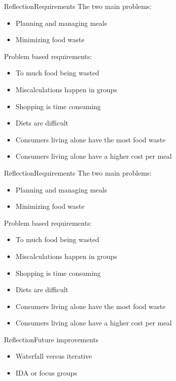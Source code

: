 \begin{frame}{Reflection}{Requirements}%
	The two main problems:
	\begin{itemize}
		\item Planning and managing meals
		\item Minimizing food waste
	\end{itemize}	
	Problem based requirements:
	\begin{itemize}
		\item To much food being wasted
		\item Miscalculations happen in groups
		\item Shopping is time consuming
		\item Diets are difficult
		\item Consumers living alone have the most food waste
		\item Consumers living alone have a higher cost per meal
	\end{itemize}

\end{frame}
\begin{frame}{Reflection}{Requirements}%
The two main problems:
	\begin{itemize} \color{dkgreen}
		\item Planning and managing meals
		\item Minimizing food waste
	\end{itemize}
	Problem based requirements:
	\begin{itemize}
		\item {\color{dkgreen}To much food being wasted}
		\item {\color{red}Miscalculations happen in groups}
		\item {\color{orange}Shopping is time consuming}
		\item {\color{dkgreen}Diets are difficult}
		\item {\color{red}Consumers living alone have the most food waste}
		\item {\color{red}Consumers living alone have a higher cost per meal}
	\end{itemize}
\end{frame}

\begin{frame}{Reflection}{Future improvements}
	\begin{itemize}
		\item Waterfall versus iterative
		\item IDA or focus groups
	\end{itemize}
\end{frame}
